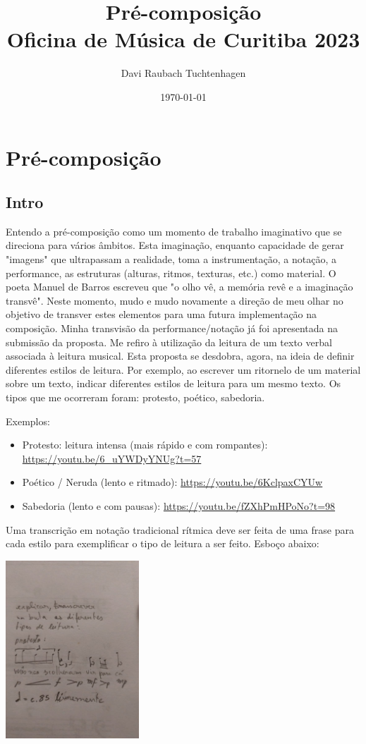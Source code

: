 \documentclass[a4paper]{article}
\author{Davi Raubach Tuchtenhagen}
\date{\today}
\title{Pré-composição\\\medskip
\large Oficina de Música de Curitiba 2023}
\begin{document}
\maketitle

\section*{Pré-composição}
\label{sec:org98ea351}
\subsection*{Intro}
\label{sec:org950ad23}
Entendo a pré-composição como um momento de trabalho imaginativo que se direciona para vários âmbitos. Esta imaginação, enquanto capacidade de gerar "imagens" que ultrapassam a realidade, toma a instrumentação, a notação, a performance, as estruturas (alturas, ritmos, texturas, etc.) como material. O poeta Manuel de Barros escreveu que "o olho vê, a memória revê e a imaginação transvê". Neste momento, mudo e mudo novamente a direção de meu olhar no objetivo de transver estes elementos para uma futura implementação na composição. Minha transvisão da performance/notação já foi apresentada na submissão da proposta. Me refiro à utilização da leitura de um texto verbal associada à leitura musical. Esta proposta se desdobra, agora, na ideia de definir diferentes estilos de leitura. Por exemplo, ao escrever um ritornelo de um material sobre um texto, indicar diferentes estilos de leitura para um mesmo texto. Os tipos que me ocorreram foram: protesto, poético, sabedoria.

Exemplos:
\begin{itemize}
\item Protesto: leitura intensa (mais rápido e com rompantes): \url{https://youtu.be/6\_uYWDyYNUg?t=57}
\item Poético / Neruda (lento e ritmado): \url{https://youtu.be/6KclpaxCYUw}
\item Sabedoria (lento e com pausas): \url{https://youtu.be/fZXhPmHPoNo?t=98}
\end{itemize}

Uma transcrição em notação tradicional rítmica deve ser feita de uma frase para cada estilo para exemplificar o tipo de leitura a ser feito. Esboço abaixo:

\begin{center}
\includegraphics[width=5cm]{exemploprotesto.jpeg}
\end{center}
\end{document}
